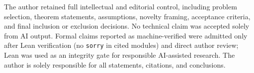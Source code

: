 The author retained full intellectual and editorial control, including problem selection, theorem statements, assumptions, novelty framing, acceptance criteria, and final inclusion or exclusion decisions. No technical claim was accepted solely from AI output. Formal claims reported as machine-verified were admitted only after Lean verification (no \texttt{sorry} in cited modules) and direct author review; Lean was used as an integrity gate for responsible AI-assisted research. The author is solely responsible for all statements, citations, and conclusions.


\appendix
